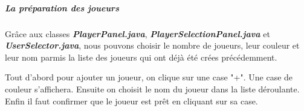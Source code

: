 \subparagraph*{La préparation des joueurs}

Grâce aux classes \textbf{\textit{PlayerPanel.java}}, \textbf{\textit{PlayerSelectionPanel.java}} et \textbf{\textit{UserSelector.java}}, nous pouvons choisir le nombre de joueurs, leur couleur et leur nom parmis la liste des joueurs qui ont déjà été crées précédemment.

Tout d'abord pour ajouter un joueur, on clique sur une case "+". Une case de couleur s'affichera. Ensuite on choisit le nom du joueur dans la liste déroulante. Enfin il faut confirmer que le joueur est prêt en cliquant sur sa case.

\begin{figure}[h!]
    \centering
    \qquad

\end{figure}
